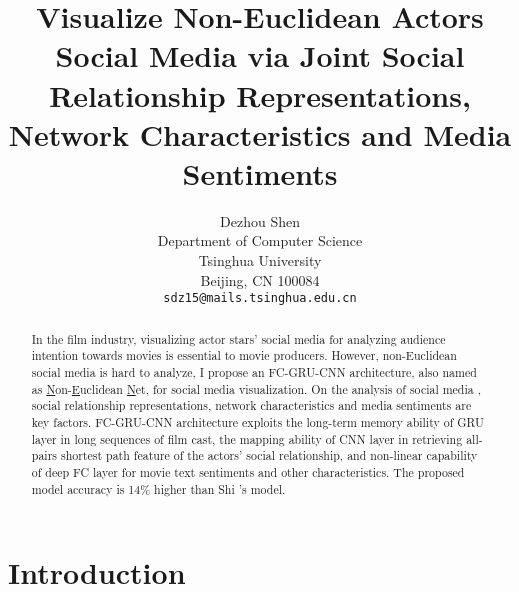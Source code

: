 \documentclass[review]{cvpr}
\begin{document}
\title{Visualize Non-Euclidean Actors Social Media via Joint Social Relationship Representations, Network Characteristics and Media Sentiments}

\author{Dezhou Shen\\
Department of Computer Science\\
Tsinghua University\\
Beijing, CN 100084\\
{\tt\small sdz15@mails.tsinghua.edu.cn}
}

\maketitle


\begin{abstract}

  In the film industry, visualizing actor stars' social media for analyzing audience intention towards movies is essential to movie producers.
  However, non-Euclidean social media is hard to analyze, I propose an FC-GRU-CNN architecture, also named as \underline{N}on-\underline{E}uclidean \underline{N}et, for social media visualization.
  On the analysis of social media , social relationship representations, network characteristics and media sentiments are key factors.
  FC-GRU-CNN architecture exploits the long-term memory ability of GRU layer in long sequences of film cast,
  the mapping ability of CNN layer in retrieving all-pairs shortest path feature of the actors' social relationship,
  and non-linear capability of deep FC layer for movie text sentiments and other characteristics.
  The proposed model accuracy is 14\% higher than Shi \etal's model.

\end{abstract}

\section{Introduction}
\end{document}
